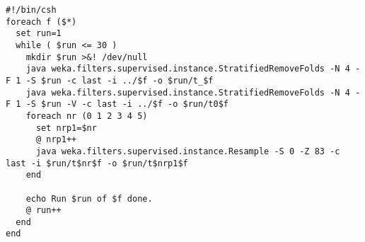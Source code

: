 
\begin{verbatim}
#!/bin/csh
foreach f ($*)
  set run=1
  while ( $run <= 30 )
    mkdir $run >&! /dev/null
    java weka.filters.supervised.instance.StratifiedRemoveFolds -N 4 -F 1 -S $run -c last -i ../$f -o $run/t_$f
    java weka.filters.supervised.instance.StratifiedRemoveFolds -N 4 -F 1 -S $run -V -c last -i ../$f -o $run/t0$f
    foreach nr (0 1 2 3 4 5)
      set nrp1=$nr
      @ nrp1++
      java weka.filters.supervised.instance.Resample -S 0 -Z 83 -c last -i $run/t$nr$f -o $run/t$nrp1$f
    end

    echo Run $run of $f done.
    @ run++
  end
end
\end{verbatim}
